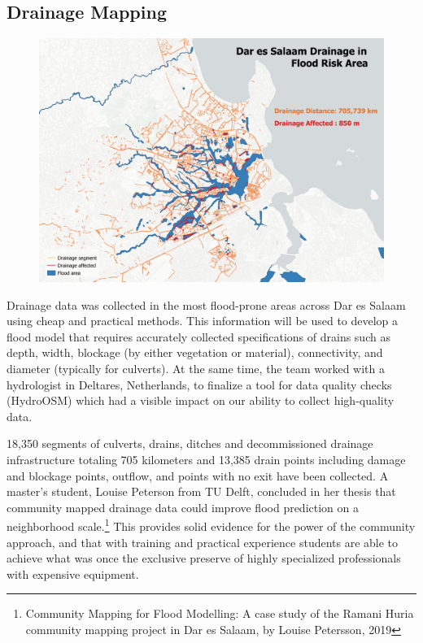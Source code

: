 \documentclass[a4paper,12pt,twoside]{article}
\begin{document}
\subsection{Drainage Mapping}
\begin{figure}[h]
    \centering
    \includegraphics[width=.8\textwidth]{images/drainmap_min.png}
    \label{fig:my_label}
\end{figure}
\begin{multicols}{2}
Drainage data was collected in the most flood-prone areas across Dar es Salaam using cheap and practical methods. This information will be used to develop a flood model that requires accurately collected specifications of drains such as depth, width, blockage (by either vegetation or material), connectivity, and diameter (typically for culverts). At the same time, the team worked with a hydrologist in Deltares, Netherlands, to finalize a tool for data quality checks (HydroOSM) which had a visible impact on our ability to collect high-quality data. 

18,350 segments of culverts, drains, ditches and decommissioned drainage infrastructure totaling 705 kilometers and 13,385 drain points including damage and blockage points, outflow, and points with no exit have been collected. A master’s student, Louise Peterson from TU Delft, concluded in her thesis that community mapped drainage data could improve flood prediction on a neighborhood scale.\footnote{ Community Mapping for Flood Modelling: A case study of the Ramani Huria community mapping project in Dar es Salaam, by Louise Petersson, 2019} This provides solid evidence for the power of the community approach, and that with training and practical experience students are able to achieve what was once the exclusive preserve of highly specialized professionals with expensive equipment. 
\end{multicols}
\end{document}
